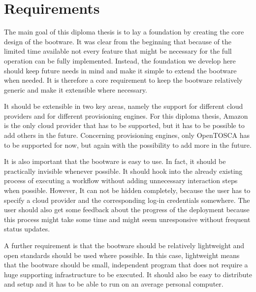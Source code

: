 \section{Requirements}

The main goal of this diploma thesis is to lay a foundation by creating the core design of the bootware.
It was clear from the beginning that because of the limited time available not every feature that might be necessary for the full operation can be fully implemented.
Instead, the foundation we develop here should keep future needs in mind and make it simple to extend the bootware when needed.
It is therefore a core requirement to keep the bootware relatively generic and make it extensible where necessary.

It should be extensible in two key areas, namely the support for different cloud providers and for different provisioning engines.
For this diploma thesis, Amazon is the only cloud provider that has to be supported, but it has to be possible to add others in the future.
Concerning provisioning engines, only OpenTOSCA has to be supported for now, but again with the possibility to add more in the future.

It is also important that the bootware is easy to use.
In fact, it should be practically invisible whenever possible.
It should hook into the already existing process of executing a workflow without adding unnecessary interaction steps when possible.
However, It can not be hidden completely, because the user has to specify a cloud provider and the corresponding log-in credentials somewhere.
The user should also get some feedback about the progress of the deployment because this process might take some time and might seem unresponsive without frequent status updates.

A further requirement is that the bootware should be relatively lightweight and open standards should be used where possible.
In this case, lightweight means that the bootware should be small, independent program that does not require a huge supporting infrastructure to be executed.
It should also be easy to distribute and setup and it has to be able to run on an average personal computer.
